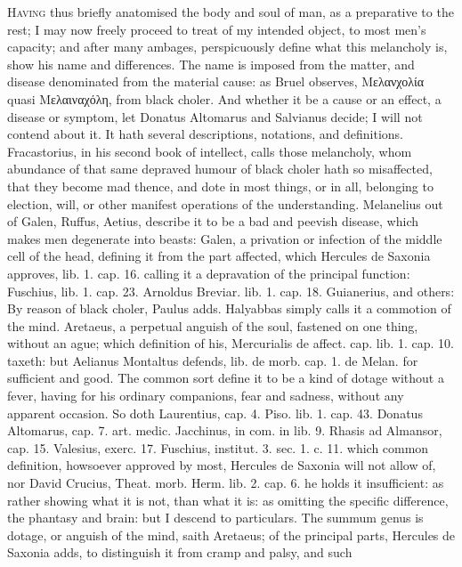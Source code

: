 {\lettrine{H}{aving} thus briefly anatomised the body and soul of man, as a
preparative to the rest; I may now freely proceed to treat of my
intended object, to most men's capacity; and after many ambages,
perspicuously define what this melancholy is, show his name and
differences. The name is imposed from the matter, and disease
denominated from the material cause: as Bruel observes, Μελανχολία
quasi Μελαιναχόλη, from black choler. And whether it be a cause or an
effect, a disease or symptom, let Donatus Altomarus and Salvianus
decide; I will not contend about it. It hath several descriptions,
notations, and definitions. Fracastorius, in his second book of
intellect, calls those melancholy, whom abundance of that same depraved
humour of black choler hath so misaffected, that they become mad
thence, and dote in most things, or in all, belonging to election,
will, or other manifest operations of the understanding. 
Melanelius out of Galen, Ruffus, Aetius, describe it to be a bad and
peevish disease, which makes men degenerate into beasts: Galen, a
privation or infection of the middle cell of the head, \etc{} defining it
from the part affected, which Hercules de Saxonia approves, lib.
1. cap. 16. calling it a depravation of the principal function:
Fuschius, lib. 1. cap. 23. Arnoldus Breviar. lib. 1. cap. 18.
Guianerius, and others: By reason of black choler, Paulus adds.
Halyabbas simply calls it a commotion of the mind. Aretaeus, a
perpetual anguish of the soul, fastened on one thing, without an ague;
which definition of his, Mercurialis de affect. cap. lib. 1. cap. 10.
taxeth: but Aelianus Montaltus defends, lib. de morb. cap. 1. de Melan.
for sufficient and good. The common sort define it to be a kind of
dotage without a fever, having for his ordinary companions, fear and
sadness, without any apparent occasion. So doth Laurentius, cap. 4.
Piso. lib. 1. cap. 43. Donatus Altomarus, cap. 7. art. medic.
Jacchinus, in com. in lib. 9. Rhasis ad Almansor, cap. 15. Valesius,
exerc. 17. Fuschius, institut. 3. sec. 1. c. 11. \etc{} which common
definition, howsoever approved by most, Hercules de Saxonia will
not allow of, nor David Crucius, Theat. morb. Herm. lib. 2. cap. 6. he
holds it insufficient: as rather showing what it is not, than
what it is: as omitting the specific difference, the phantasy and
brain: but I descend to particulars. The summum genus is dotage, or
anguish of the mind, saith Aretaeus; of the principal parts, Hercules
de Saxonia adds, to distinguish it from cramp and palsy, and such
}
